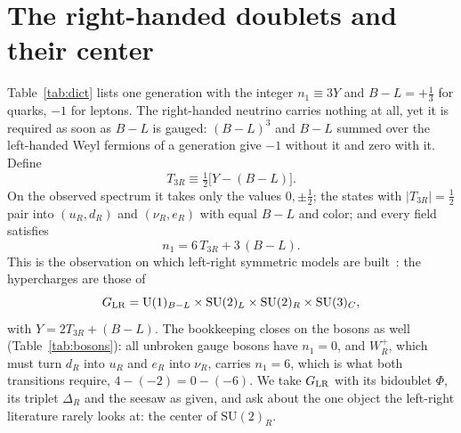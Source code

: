 \documentclass[submission, Phys]{SciPost}
\newcommand{\SU}{\mathrm{SU}}
\newcommand{\U}{\mathrm{U}}
\begin{document}
\section{The right-handed doublets and their center}
\label{sec:LR}

Table~\ref{tab:dict} lists one generation with the integer
$n_1\equiv3Y$ and $B-L=+\tfrac13$ for quarks, $-1$ for leptons. The
right-handed neutrino carries nothing at all, yet it is required as
soon as $B-L$ is gauged: $(B-L)^3$ and $B-L$ summed over the
left-handed Weyl fermions of a generation give $-1$ without it and
zero with it. Define
\begin{equation}
  T_{3R}\equiv\tfrac12\big[Y-(B-L)\big].
  \label{eq:LRdef}
\end{equation}
On the observed spectrum it takes only the values $0,\pm\tfrac12$; the
states with $|T_{3R}|=\tfrac12$ pair into $(u_R,d_R)$ and $(\nu_R,e_R)$
with equal $B-L$ and color; and every field satisfies
\begin{equation}
  n_1 = 6\,T_{3R} + 3\,(B-L).
  \label{eq:n1LR}
\end{equation}
This is the observation on which left-right symmetric models are
built~\cite{Pati_1974:PRD,Mohapatra:1974gc,Senjanovic_1975:PRD}: the
hypercharges are those of
\begin{equation}
  G_{\rm LR}=\U(1)_{B-L}\times\SU(2)_L\times\SU(2)_R\times\SU(3)_C ,
  \label{eq:GLR}
\end{equation}
with $Y=2T_{3R}+(B-L)$. The bookkeeping closes on the bosons as well
(Table~\ref{tab:bosons}): all unbroken gauge bosons have $n_1=0$, and
$W_R^+$, which must turn $d_R$ into $u_R$ and $e_R$ into $\nu_R$,
carries $n_1=6$, which is what both transitions require,
$4-(-2)=0-(-6)$. We take $G_{\rm LR}$ with its bidoublet $\Phi$, its
triplet $\Delta_R$ and the seesaw as given, and ask about the one
object the left-right literature rarely looks at: the center of
$\SU(2)_R$.
\end{document}
